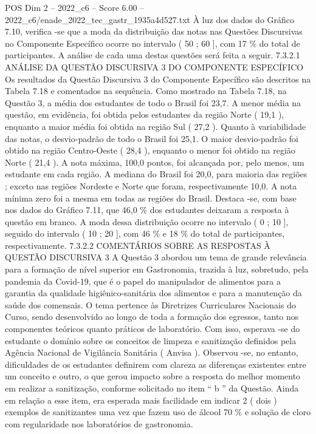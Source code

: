 \begin{textsample}{POS Dim 2 – 2022\_c6 – Score 6.00 – 2022\_c6/enade\_2022\_tec\_gastr\_1935a4d527.txt}
À luz dos dados do Gráfico 7.10, verifica -se que a moda da distribuição das notas nas Questões Discursivas no Componente Específico ocorre no intervalo ( 50 ; 60 ], com 17 \% do total de participantes.
A análise de cada uma destas questões será feita a seguir. 7.3.2.1 ANÁLISE DA QUESTÃO DISCURSIVA 3 DO COMPONENTE ESPECÍFICO Os resultados da Questão Discursiva 3 do Componente Específico são descritos na Tabela 7.18 e comentados na sequência.
Como mostrado na Tabela 7.18, na Questão 3, a média dos estudantes de todo o Brasil foi 23,7.
A menor média na questão, em evidência, foi obtida pelos estudantes da região Norte ( 19,1 ), enquanto a maior média foi obtida na região Sul ( 27,2 ).
Quanto à variabilidade das notas, o desvio-padrão de todo o Brasil foi 25,1.
O maior desvio-padrão foi obtido na região Centro-Oeste ( 28,4 ), enquanto o menor foi obtido na região Norte ( 21,4 ).
A nota máxima, 100,0 pontos, foi alcançada por, pelo menos, um estudante em cada região.
A mediana do Brasil foi 20,0, para maioria das regiões ; exceto nas regiões Nordeste e Norte que foram, respectivamente 10,0.
A nota mínima zero foi a mesma em todas as regiões do Brasil.
Destaca -se, com base nos dados do Gráfico 7.11, que 46,0 \% dos estudantes deixaram a resposta à questão em branco.
A moda dessa distribuição ocorre no intervalo ( 0 ; 10 ], seguido do intervalo ( 10 ; 20 ], com 46 \% e 18 \% do total de participantes, respectivamente. 7.3.2.2 COMENTÁRIOS SOBRE AS RESPOSTAS À QUESTÃO DISCURSIVA 3 A Questão 3 abordou um tema de grande relevância para a formação de nível superior em Gastronomia, trazida à luz, sobretudo, pela pandemia da Covid-19, que é o papel do manipulador de alimentos para a garantia da qualidade higiênico-sanitária dos alimentos e para a manutenção da saúde dos comensais.
O tema pertence às Diretrizes Curriculares Nacionais do Curso, sendo desenvolvido ao longo de toda a formação dos egressos, tanto nos componentes teóricos quanto práticos de laboratório.
Com isso, esperava -se do estudante o domínio sobre os conceitos de limpeza e sanitização definidos pela Agência Nacional de Vigilância Sanitária ( Anvisa ).
Observou -se, no entanto, dificuldades de os estudantes definirem com clareza as diferenças existentes entre um conceito e outro, o que gerou impacto sobre a resposta do melhor momento em realizar a sanitização, conforme solicitado no item “ b ” da Questão.
Ainda em relação a esse item, era esperada mais facilidade em indicar 2 ( dois ) exemplos de sanitizantes uma vez que fazem uso de álcool 70 \% e solução de cloro com regularidade nos laboratórios de gastronomia.

\end{textsample}
